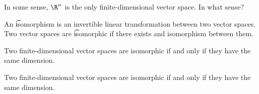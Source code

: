 
\sbasic


































\sstart
{}


In some sense, $\R^n$ is the only finite-dimensional vector space.
In what sense?


An \t{isomorphism} is an invertible linear transformation between two vector spaces.
Two vector spaces are \t{isomorphic} if there exists and isomorphism between them.


\begin{prop}
  Two finite-dimensional vector spaces are isomorphic if and only if they have the same dimension.
\end{prop}

\begin{corr}
  Two finite-dimensional vector spaces are isomorphic if and only if they have the same dimension.
\end{corr}
\strats
